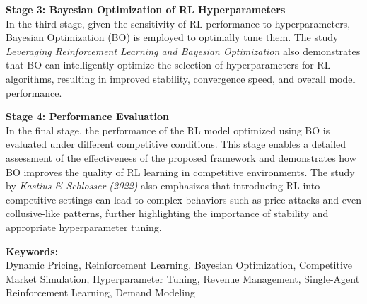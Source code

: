 \documentclass[11pt,a4paper]{article}
\begin{document}
\begin{tcolorbox}
\textbf{Stage 3: Bayesian Optimization of RL Hyperparameters}\\
In the third stage, given the sensitivity of RL performance to hyperparameters, Bayesian Optimization (BO) is employed to optimally tune them. The study \textit{Leveraging Reinforcement Learning and Bayesian Optimization} also demonstrates that BO can intelligently optimize the selection of hyperparameters for RL algorithms, resulting in improved stability, convergence speed, and overall model performance.

\textbf{Stage 4: Performance Evaluation}\\
In the final stage, the performance of the RL model optimized using BO is evaluated under different competitive conditions. This stage enables a detailed assessment of the effectiveness of the proposed framework and demonstrates how BO improves the quality of RL learning in competitive environments. The study by \textit{Kastius \& Schlosser (2022)} also emphasizes that introducing RL into competitive settings can lead to complex behaviors such as price attacks and even collusive-like patterns, further highlighting the importance of stability and appropriate hyperparameter tuning.

\vspace{0.3cm}
\textbf{Keywords:}\\
Dynamic Pricing, Reinforcement Learning, Bayesian Optimization, Competitive Market Simulation, Hyperparameter Tuning, Revenue Management, Single-Agent Reinforcement Learning, Demand Modeling
\end{tcolorbox}
\end{document}
